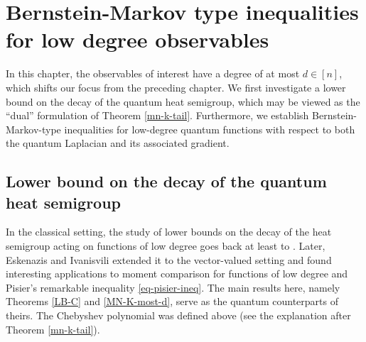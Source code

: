 \documentclass{amsbook}
\theoremstyle{definition}
\theoremstyle{remark}
\numberwithin{section}{chapter}
\numberwithin{equation}{chapter}
\newcommand{\1}{\mathbf{1}}
\begin{document}
\chapter[BM Inequalities for Low Degree Observables]{Bernstein-Markov type inequalities for low degree observables}\label{sec-bm}

In this chapter, the observables of interest have a degree of at most $d \in [n]$, which shifts our focus from the preceding chapter. We first investigate a lower bound on the decay of the quantum heat semigroup, which may be viewed as the ``dual'' formulation of Theorem \ref{mn-k-tail}. Furthermore, we establish Bernstein-Markov-type inequalities for low-degree quantum functions with respect to both the quantum Laplacian and its associated gradient. 

\section{Lower bound on the  decay of the quantum heat semigroup}
In the classical setting, the study of lower bounds on the decay of the heat semigroup
acting on functions of low degree goes back at least to \cite{FHKL2016}. Later, Eskenazis  and Ivanisvili \cite{EI2020} extended it to the vector-valued setting and found interesting applications to moment comparison for functions of low degree and Pisier's remarkable inequality \eqref{eq-pisier-ineq}. The main results here, namely Theorems \ref{LB-C} and \ref{MN-K-most-d}, serve as the quantum counterparts of theirs. The Chebyshev polynomial was defined above (see the explanation after Theorem \ref{mn-k-tail}).
\end{document}
